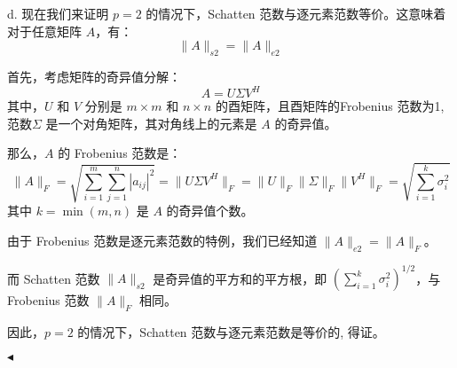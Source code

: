 \documentclass[11pt]{article}
\newenvironment{question}[2][Question]{\begin{trivlist}
\item[\hskip \labelsep {\bfseries #1}\hskip \labelsep {\bfseries #2.}]}{\hfill$\blacktriangleleft$\end{trivlist}}
\begin{document}
\begin{question}{3 (11') (矩阵范数)}
    d. 
    现在我们来证明 \( p = 2 \) 的情况下，Schatten 范数与逐元素范数等价。这意味着对于任意矩阵 \( A \)，有：
    \[
    \|A\|_{s2} = \|A\|_{e2}
    \]
    
    首先，考虑矩阵的奇异值分解：
    \[
    A = U \Sigma V^H
    \]
    其中，\( U \) 和 \( V \) 分别是 \( m \times m \) 和 \( n \times n \) 的酉矩阵，且酉矩阵的Frobenius 范数为1, 范数\( \Sigma \) 是一个对角矩阵，其对角线上的元素是 \( A \) 的奇异值。
    
    那么，\( A \) 的 Frobenius 范数是：
    \[
    \|A\|_F = \sqrt{\sum_{i=1}^{m} \sum_{j=1}^{n} |a_{ij}|^2} = \|U \Sigma V^H\|_F = \|U\|_F \|\Sigma\|_F \|V^H\|_F = \sqrt{\sum_{i=1}^{k} \sigma_i^2}
    \]
    其中 \( k = \min(m, n) \) 是 \( A \) 的奇异值个数。
    
    由于 Frobenius 范数是逐元素范数的特例，我们已经知道 \( \|A\|_{e2} = \|A\|_F \)。
    
    而 Schatten 范数 \( \|A\|_{s2} \) 是奇异值的平方和的平方根，即 \( (\sum_{i=1}^{k} \sigma_i^2)^{1/2} \)，与 Frobenius 范数 \( \|A\|_F \) 相同。
    
    因此，\( p = 2 \) 的情况下，Schatten 范数与逐元素范数是等价的, 得证。
    
    \end{question}

    
        
\end{document}
